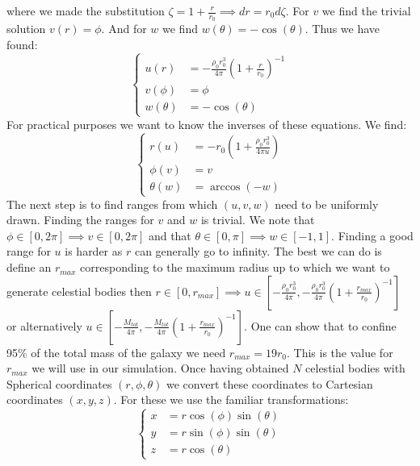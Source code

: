 \documentclass[]{article}
\begin{document}
where we made the substitution $\zeta = 1+\frac{r}{r_0} \implies dr = r_0 d\zeta$. For $v$ we find the trivial solution $v(r) = \phi$. And for $w$ we find $w(\theta) = -\cos(\theta)$. Thus we have found:
\begin{equation}
	\begin{cases}
		u(r) &= -\frac{\rho_0r_0^3}{4\pi}\left(1+\frac{r}{r_0}\right)^{-1}\\
		v(\phi) &= \phi\\
		w(\theta) &= -\cos(\theta)
	\end{cases}
\end{equation}
For practical purposes we want to know the inverses of these equations. We find:
\begin{equation}
	\begin{cases}
		r(u) &= -r_0\left(1+\frac{\rho_0r_0^3}{4\pi u}\right)\\
		\phi(v) &= v\\
		\theta(w) &= \arccos(-w)
	\end{cases}
\end{equation}
The next step is to find ranges from which $(u, v, w)$ need to be uniformly drawn. Finding the ranges for $v$ and $w$ is trivial. We note that $\phi\in[0, 2\pi] \implies v\in[0, 2\pi]$ and that $\theta\in[0, \pi] \implies w\in[-1, 1]$. Finding a good range for $u$ is harder as $r$ can generally go to infinity. The best we can do is define an $r_{max}$ corresponding to the maximum radius up to which we want to generate celestial bodies then $r\in[0, r_{max}] \implies u\in\left[-\frac{\rho_0 r_0^3}{4\pi}, -\frac{\rho_0 r_0^3}{4\pi}\left(1+\frac{r_{max}}{r_0}\right)^{-1}\right]$ or alternatively $u\in\left[-\frac{M_{tot}}{4\pi}, -\frac{M_{tot}}{4\pi}\left(1+\frac{r_{max}}{r_0}\right)^{-1}\right]$. One can show that to confine 95\% of the total mass of the galaxy we need $r_{max} = 19r_0$. This is the value for $r_{max}$ we will use in our simulation.\newline %
Once having obtained $N$ celestial bodies with Spherical coordinates $(r, \phi, \theta)$ we convert these coordinates to Cartesian coordinates $(x, y, z)$. For these we use the familiar transformations:
\begin{equation}
	\begin{cases}
		x &= r\cos(\phi)\sin(\theta)\\
		y &= r\sin(\phi)\sin(\theta)\\
		z &= r\cos(\theta)
	\end{cases}
\end{equation}
\end{document}
